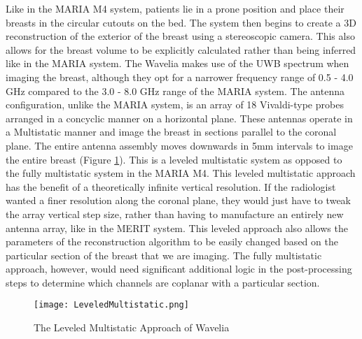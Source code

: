 Like in the MARIA M4 system, patients lie in a prone position and place their breasts in the circular cutouts on the
bed. The system then begins to create a 3D reconstruction of the exterior of the breast using a stereoscopic camera.
This also allows for the breast volume to be explicitly calculated rather than being inferred like in the MARIA system.
The Wavelia makes use of the UWB spectrum when imaging the breast, although they opt for a narrower frequency range of
0.5 - 4.0 GHz compared to the 3.0 - 8.0 GHz range of the MARIA system. The antenna configuration, unlike the MARIA system, is an array of 18 Vivaldi-type probes arranged in a concyclic manner
on a horizontal plane. These antennas operate in a Multistatic manner and image the breast in sections parallel to the
coronal plane. The entire antenna assembly moves downwards in 5mm intervals to image the entire breast (Figure \ref{fig:LeveledMultistaticExample}). This is a
leveled multistatic system as opposed to the fully multistatic system in the MARIA M4. This leveled multistatic approach
has the benefit of a theoretically infinite vertical resolution. If the radiologist wanted a finer resolution along the
coronal plane, they would just have to tweak the array vertical step size, rather than having to manufacture an entirely
new antenna array, like in the MERIT system. This leveled approach also allows the parameters of the reconstruction
algorithm to be easily changed based on the particular section of the breast that we are imaging. The fully multistatic
approach, however, would need significant additional logic in the post-processing steps to determine which channels are
coplanar with a particular section. \hfill \break

\begin{figure}
    \texttt{[image: LeveledMultistatic.png]}
    \centering
    \caption{The Leveled Multistatic Approach of Wavelia \cite{moloneyWaveliaMicrowaveBreast2021}}
    \label{fig:LeveledMultistaticExample}
\end{figure}

